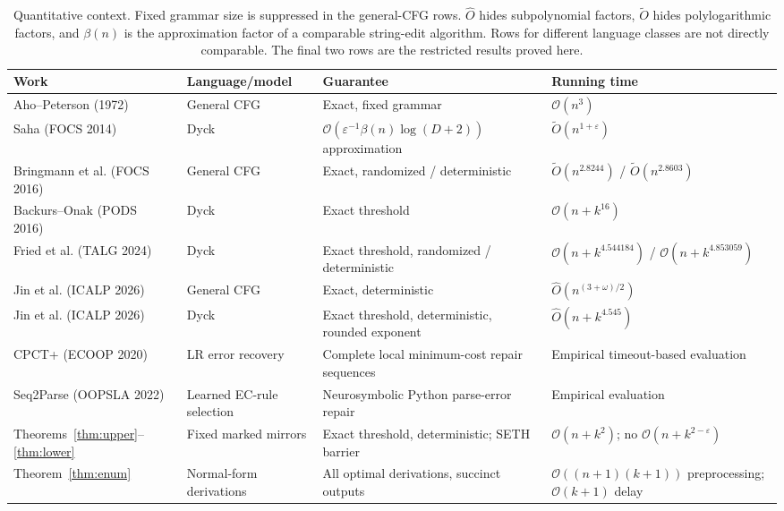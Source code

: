 \documentclass[sigconf,screen]{acmart}
\newcommand{\eps}{\varepsilon}
\newcommand{\Oh}{\mathcal O}
\theoremstyle{definition}
\begin{document}
\begin{table}[t]
\caption{Quantitative context. Fixed grammar size is suppressed in the general-CFG rows. $\widehat O$ hides subpolynomial factors, $\widetilde O$ hides polylogarithmic factors, and $\beta(n)$ is the approximation factor of a comparable string-edit algorithm. Rows for different language classes are not directly comparable. The final two rows are the restricted results proved here.}
\label{tab:related}
\small
\begin{tabularx}{\textwidth}{@{}l l X l@{}}
\toprule
Work & Language/model & Guarantee & Running time\\
\midrule
Aho--Peterson (1972)~\cite{aho1972} & General CFG & Exact, fixed grammar & $\Oh(n^3)$\\
Saha (FOCS 2014)~\cite{saha2014} & Dyck & $\Oh(\eps^{-1}\beta(n)\log(D+2))$ approximation & $\widetilde O(n^{1+\eps})$\\
Bringmann et al. (FOCS 2016)~\cite{bgsv2019} & General CFG & Exact, randomized / deterministic & $\widetilde O(n^{2.8244})$ / $\widetilde O(n^{2.8603})$\\
Backurs--Onak (PODS 2016)~\cite{backursonak2016} & Dyck & Exact threshold & $\Oh(n+k^{16})$\\
Fried et al. (TALG 2024)~\cite{fried2024} & Dyck & Exact threshold, randomized / deterministic & $\Oh(n+k^{4.544184})$ / $\Oh(n+k^{4.853059})$\\
Jin et al. (ICALP 2026)~\cite{jin2026} & General CFG & Exact, deterministic & $\widehat O(n^{(3+\omega)/2})$\\
Jin et al. (ICALP 2026)~\cite{jin2026} & Dyck & Exact threshold, deterministic, rounded exponent & $\widehat O(n+k^{4.545})$\\
CPCT+ (ECOOP 2020)~\cite{cpct2020} & LR error recovery & Complete local minimum-cost repair sequences & Empirical timeout-based evaluation\\
Seq2Parse (OOPSLA 2022)~\cite{seq2parse2022} & Learned EC-rule selection & Neurosymbolic Python parse-error repair & Empirical evaluation\\
Theorems~\ref{thm:upper}--\ref{thm:lower} & Fixed marked mirrors & Exact threshold, deterministic; SETH barrier & $\Oh(n+k^2)$; no $\Oh(n+k^{2-\eps})$\\
Theorem~\ref{thm:enum} & Normal-form derivations & All optimal derivations, succinct outputs & $\Oh((n+1)(k+1))$ preprocessing; $\Oh(k+1)$ delay\\
\bottomrule
\end{tabularx}
\end{table}
\end{document}
